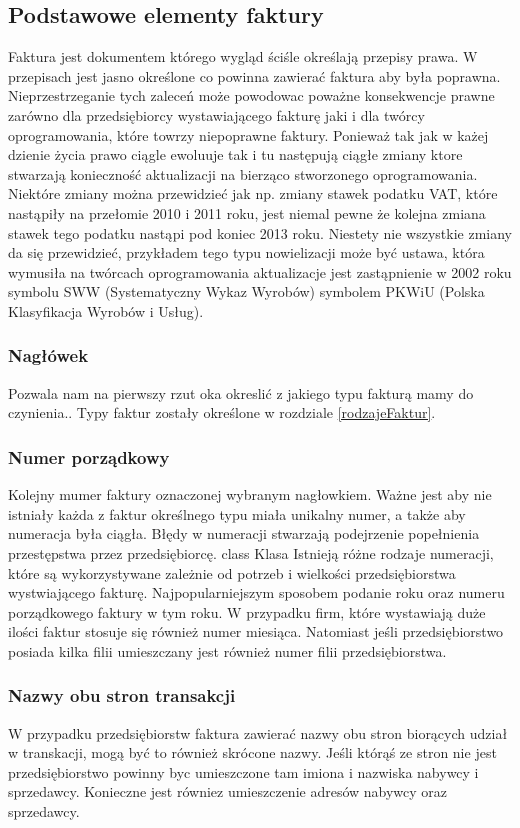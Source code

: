 \subsection{Podstawowe elementy faktury}
Faktura jest dokumentem którego wygląd ściśle określają przepisy prawa.
W przepisach jest jasno określone co powinna zawierać faktura aby była poprawna.
Nieprzestrzeganie tych zaleceń może powodowac poważne konsekwencje prawne
zarówno dla przedsiębiorcy wystawiającego fakturę jaki i dla twórcy
oprogramowania, które towrzy niepoprawne faktury. Ponieważ tak jak w każej
dzienie życia prawo ciągle ewoluuje tak i tu następują ciągłe zmiany ktore
stwarzają konieczność aktualizacji na bierząco stworzonego oprogramowania. Niektóre zmiany
można przewidzieć jak np. zmiany stawek podatku VAT, które nastąpiły na
przełomie 2010 i 2011 roku, jest niemal pewne że kolejna zmiana stawek tego
podatku nastąpi pod koniec 2013 roku.
Niestety nie wszystkie zmiany da się przewidzieć, przykładem tego typu
nowielizacji może być ustawa, która wymusiła na twórcach oprogramowania
aktualizacje jest zastąpnienie w 2002 roku symbolu SWW (Systematyczny Wykaz
Wyrobów) symbolem PKWiU (Polska Klasyfikacja Wyrobów i Usług).
\subsubsection{Nagłówek}
Pozwala nam na pierwszy rzut oka okreslić z jakiego typu fakturą mamy do
czynienia.. Typy faktur zostały
określone w rozdziale \ref{rodzajeFaktur}. 
\subsubsection{Numer porządkowy}
Kolejny mumer faktury oznaczonej wybranym nagłowkiem. Ważne jest aby nie
istniały każda z faktur określnego typu miała unikalny numer, a także aby
numeracja była ciągła. Błędy w numeracji stwarzają podejrzenie popełnienia
przestępstwa przez przedsiębiorcę.
class Klasa {
}
Istnieją różne rodzaje numeracji, które są wykorzystywane zależnie od potrzeb i
wielkości przedsiębiorstwa wystwiającego fakturę. Najpopularniejszym sposobem
podanie roku oraz numeru porządkowego faktury w tym roku. W przypadku firm,
które wystawiają duże ilości faktur stosuje się również numer miesiąca.
Natomiast jeśli przedsiębiorstwo posiada kilka filii umieszczany jest również
numer filii przedsiębiorstwa.
\subsubsection{Nazwy obu stron transakcji}
W przypadku przedsiębiorstw faktura zawierać nazwy obu
stron biorących udział w transkacji, mogą być to również skrócone nazwy. Jeśli
którąś ze stron nie jest przedsiębiorstwo powinny byc umieszczone tam imiona i
nazwiska nabywcy i sprzedawcy. Konieczne jest równiez umieszczenie adresów
nabywcy oraz sprzedawcy.
